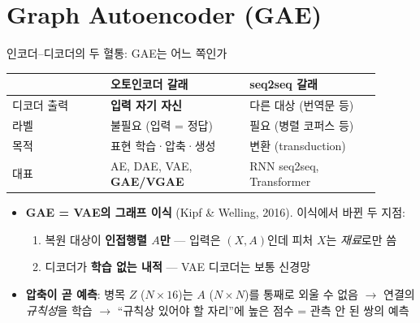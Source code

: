 \section{Graph Autoencoder (GAE)}

\begin{frame}{인코더--디코더의 두 혈통: GAE는 어느 쪽인가}
\small
\begin{tabular}{p{0.24\linewidth} p{0.34\linewidth} p{0.32\linewidth}}
\toprule
 & \textbf{오토인코더 갈래} & \textbf{seq2seq 갈래} \\
\midrule
디코더 출력 & \textbf{입력 자기 자신} & 다른 대상 (번역문 등) \\
라벨        & 불필요 (입력 = 정답)    & 필요 (병렬 코퍼스 등) \\
목적        & 표현 학습·압축·생성     & 변환 (transduction) \\
대표        & AE, DAE, VAE, \textbf{GAE/VGAE} & RNN seq2seq, Transformer \\
\bottomrule
\end{tabular}
\vspace{0.5em}
\begin{itemize}
  \item \textbf{GAE = VAE의 그래프 이식} (Kipf \& Welling, 2016). 이식에서 바뀐 두 지점:
  \begin{enumerate}
    \item 복원 대상이 \textbf{인접행렬 $A$만} — 입력은 $(X,A)$인데 피처 $X$는 \emph{재료}로만 씀
    \item 디코더가 \textbf{학습 없는 내적} — VAE 디코더는 보통 신경망
  \end{enumerate}
  \item \textbf{압축이 곧 예측}: 병목 $Z$ ($N{\times}16$)는 $A$ ($N{\times}N$)를 통째로 외울 수 없음 $\to$ 연결의 \emph{규칙성}을 학습 $\to$ ``규칙상 있어야 할 자리''에 높은 점수 = 관측 안 된 쌍의 예측
\end{itemize}
\end{frame}


